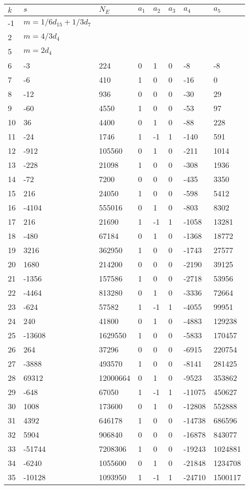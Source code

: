 \documentclass{amsart}
\begin{document}
\begin{longtable}{|l|l|l|lllll|}
\hline
$k$ & $s$ & $N_E$ & $a_1$ & $a_2$ & $a_3$ & $a_4$ & $a_5$\\
\hline
-1&$m=1/6d_{15}+1/3d_{7}$&&\multicolumn{5}{c|}{}\\
2&$m=4/3d_{4}$&&\multicolumn{5}{c|}{}\\
5&$m=2d_{4}$&&\multicolumn{5}{c|}{}\\
6&-3&224&0&1&0&-8&-8\\
7&-6&410&1&0&0&-16&0\\
8&-12&936&0&0&0&-30&29\\
9&-60&4550&1&0&0&-53&97\\
10&36&4400&0&1&0&-88&228\\
11&-24&1746&1&-1&1&-140&591\\
12&-912&105560&0&1&0&-211&1014\\
13&-228&21098&1&0&0&-308&1936\\
14&-72&7200&0&0&0&-435&3350\\
15&216&24050&1&0&0&-598&5412\\
16&-4104&555016&0&1&0&-803&8302\\
17&216&21690&1&-1&1&-1058&13281\\
18&-480&67184&0&1&0&-1368&18772\\
19&3216&362950&1&0&0&-1743&27577\\
20&1680&214200&0&0&0&-2190&39125\\
21&-1356&157586&1&0&0&-2718&53956\\
22&-4464&813280&0&1&0&-3336&72664\\
23&-624&57582&1&-1&1&-4055&99951\\
24&240&41800&0&1&0&-4883&129238\\
25&-13608&1629550&1&0&0&-5833&170457\\
26&264&37296&0&0&0&-6915&220754\\
27&-3888&493570&1&0&0&-8141&281425\\
28&69312&12000664&0&1&0&-9523&353862\\
29&-648&67050&1&-1&1&-11075&450627\\
30&1008&173600&0&1&0&-12808&552888\\
31&4392&646178&1&0&0&-14738&686596\\
32&5904&906840&0&0&0&-16878&843077\\
33&-51744&7208306&1&0&0&-19243&1024881\\
34&-6240&1055600&0&1&0&-21848&1234708\\
35&-10128&1093950&1&-1&1&-24710&1500117\\

\end{longtable}
\end{document}
